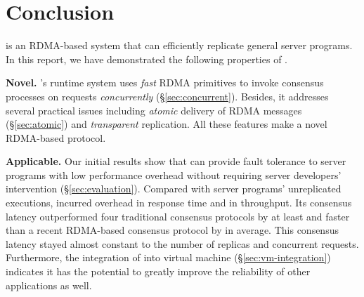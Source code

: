 \section{Conclusion} \label{sec:conclusion}

\xxx is an RDMA-based \paxos system that can efficiently replicate general 
server programs. In this report, we have demonstrated the following properties 
of \xxx.

\textbf{Novel.} \xxx's runtime system uses \emph{fast} RDMA primitives to 
invoke consensus processes on requests \emph{concurrently} 
(\S\ref{sec:concurrent}). Besides, it addresses several practical issues 
including \emph{atomic} delivery of RDMA messages (\S\ref{sec:atomic}) and  
\emph{transparent} replication. All these features make \xxx a novel RDMA-based 
\paxos protocol.

\textbf{Applicable.} Our initial results show that \xxx can provide fault 
tolerance to server programs with low performance overhead without requiring 
server developers' intervention (\S\ref{sec:evaluation}). Compared with \nprog 
server programs' unreplicated executions, \xxx incurred \latencyoverhead 
overhead in response time and \tputoverhead in throughput. Its consensus 
latency outperformed four traditional consensus protocols by at least 
\comptradlow and faster than a recent RDMA-based consensus protocol \dare by 
\fasterDARE in average. This consensus latency stayed almost constant  to the 
number of replicas and concurrent requests. Furthermore, the integration of 
\xxx into virtual machine (\S\ref{sec:vm-integration}) indicates it has the 
potential to greatly improve the reliability of other applications as well.
